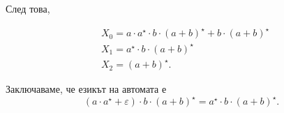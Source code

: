 След това,

\begin{align*}
  & X_0 = a \cdot a^\star \cdot b \cdot (a+b)^\star + b \cdot (a+b)^\star\\
  & X_1 = a^\star \cdot b \cdot (a+b)^\star\\
  & X_2 = (a+b)^\star.
\end{align*}

Заключаваме, че езикът на автомата е
\[(a \cdot a^\star + \varepsilon) \cdot b \cdot (a+b)^\star = a^\star \cdot b \cdot (a+b)^\star.\]



